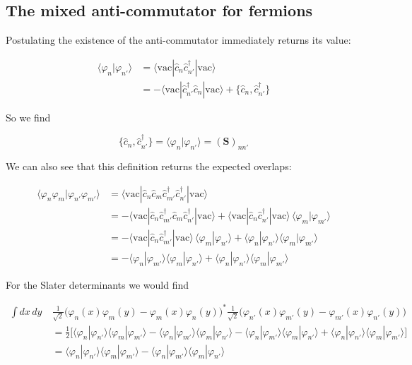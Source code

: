 \subsection*{The mixed anti-commutator for fermions}

Postulating the existence of the anti-commutator immediately returns its value:

\begin{align*}
\langle\varphi_n|\varphi_{n'}\rangle &= \langle\mathrm{vac}|\hat c_n \hat c_{n'}^\dagger|\mathrm{vac}\rangle \\
&= -\langle\mathrm{vac}|\hat c_{n'}^\dagger \hat c_n|\mathrm{vac}\rangle + \{\hat c_n, \hat c_{n'}^\dagger\}
\end{align*}

So we find

\begin{equation}
\{\hat c_n, \hat c_{n'}^\dagger\} = \langle\varphi_n|\varphi_{n'}\rangle = \left(\mathbf{S}\right)_{nn'}
\end{equation}

We can also see that this definition returns the expected overlaps:

\begin{align*}
\langle\varphi_n\varphi_m|\varphi_{n'}\varphi_{m'}\rangle &= \langle\mathrm{vac}|\hat c_n\hat c_m \hat c_{m'}^\dagger\hat c_{n'}^\dagger|\mathrm{vac}\rangle \\
&= -\langle\mathrm{vac}|\hat c_n \hat c_{m'}^\dagger \hat c_m \hat c_{n'}^\dagger|\mathrm{vac}\rangle + \langle\mathrm{vac}|\hat c_n\hat c_{n'}^\dagger|\mathrm{vac}\rangle\,\langle\varphi_m|\varphi_{m'}\rangle \\
&= -\langle\mathrm{vac}|\hat c_n\hat c_{m'}^\dagger|\mathrm{vac}\rangle\,\langle\varphi_m|\varphi_{n'}\rangle + \langle\varphi_n|\varphi_{n'}\rangle\langle\varphi_m|\varphi_{m'}\rangle \\
&= -\langle\varphi_n|\varphi_{m'}\rangle\langle\varphi_m|\varphi_{n'}\rangle + \langle\varphi_n|\varphi_{n'}\rangle\langle\varphi_m|\varphi_{m'}\rangle
\end{align*}

For the Slater determinants we would find

\begin{align*}
\int dx\,dy\ &\frac{1}{\sqrt2}\Big(\varphi_n(x)\varphi_m(y) - \varphi_m(x)\varphi_n(y)\Big)^*
\frac{1}{\sqrt2}\Big(\varphi_{n'}(x)\varphi_{m'}(y) - \varphi_{m'}(x)\varphi_{n'}(y)\Big) \\
&= \frac{1}{2}\Big[\langle\varphi_n|\varphi_{n'}\rangle\langle\varphi_m|\varphi_{m'}\rangle - \langle\varphi_n|\varphi_{m'}\rangle\langle\varphi_m|\varphi_{n'}\rangle
- \langle\varphi_n|\varphi_{m'}\rangle\langle\varphi_m|\varphi_{n'}\rangle + \langle\varphi_n|\varphi_{n'}\rangle\langle\varphi_m|\varphi_{m'}\rangle \Big] \\
&= \langle\varphi_n|\varphi_{n'}\rangle\langle\varphi_m|\varphi_{m'}\rangle - \langle\varphi_n|\varphi_{m'}\rangle\langle\varphi_m|\varphi_{n'}\rangle
\end{align*}

